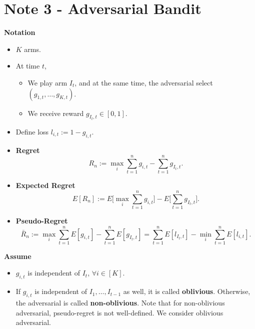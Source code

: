 \clearpage
\section{Note 3 - Adversarial Bandit}

\textbf{Notation}
\begin{itemize}
    \item $K$ arms.
    \item At time $t$,
        \begin{itemize}
            \item We play arm $I_t$, and at the same time,
                the adversarial select $(g_{1,t}, \dots, g_{K,t})$.
            \item We receive reward $g_{I_t, t}\in[0,1]$.
        \end{itemize}
    \item Define loss $l_{i,t}:=1-g_{i,t}$.
    \item \textbf{Regret}
        \begin{equation}
            R_n := \max_i \sum_{t=1}^n g_{i,t} - \sum_{t=1}^n g_{I_t, t}.
        \end{equation}
    \item \textbf{Expected Regret}
        \begin{equation}
            E[R_n] := E\bigg[\max_i \sum_{t=1}^n g_{i,t}\bigg] - E\bigg[\sum_{t=1}^n g_{I_t, t}\bigg].
        \end{equation}
    \item \textbf{Pseudo-Regret}
        \begin{equation}
            \bar R_n := \max_i \sum_{t=1}^n E[g_{i,t}] - \sum_{t=1}^n E[g_{I_t, t}]
                = \sum_{t=1}^n E[l_{I_t, t}] - \min_i \sum_{t=1}^n E[l_{i,t}].
        \end{equation}
\end{itemize}

\textbf{Assume}
\begin{itemize}
    \item $g_{i,t}$ is independent of $I_t$, $\forall i\in[K]$.
    \item If $g_{i,t}$ is independent of $I_1, \dots, I_{t-1}$ as well,
        it is called \textbf{oblivious}.
        Otherwise, the adversarial is called \textbf{non-oblivious}.
        Note that for non-oblivious adversarial, pseudo-regret is not well-defined.
        We consider oblivious adversarial.
\end{itemize}

